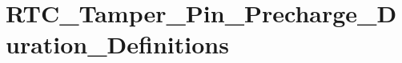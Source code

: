 \hypertarget{group___r_t_c___tamper___pin___precharge___duration___definitions}{\section{R\-T\-C\-\_\-\-Tamper\-\_\-\-Pin\-\_\-\-Precharge\-\_\-\-Duration\-\_\-\-Definitions}
\label{group___r_t_c___tamper___pin___precharge___duration___definitions}
}
